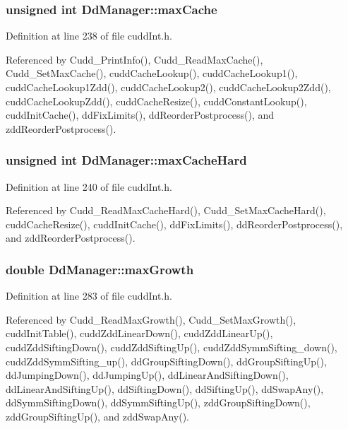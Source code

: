 \subsubsection{\setlength{\rightskip}{0pt plus 5cm}unsigned int \bf{Dd\-Manager::max\-Cache}}\label{structDdManager_b84e06c3faa0e9bb04501ede05b5fcc1}




Definition at line 238 of file cudd\-Int.h.

Referenced by Cudd\_\-Print\-Info(), Cudd\_\-Read\-Max\-Cache(), Cudd\_\-Set\-Max\-Cache(), cudd\-Cache\-Lookup(), cudd\-Cache\-Lookup1(), cudd\-Cache\-Lookup1Zdd(), cudd\-Cache\-Lookup2(), cudd\-Cache\-Lookup2Zdd(), cudd\-Cache\-Lookup\-Zdd(), cudd\-Cache\-Resize(), cudd\-Constant\-Lookup(), cudd\-Init\-Cache(), dd\-Fix\-Limits(), dd\-Reorder\-Postprocess(), and zdd\-Reorder\-Postprocess().
\subsubsection{\setlength{\rightskip}{0pt plus 5cm}unsigned int \bf{Dd\-Manager::max\-Cache\-Hard}}\label{structDdManager_1b53bee9cf86fc1131c420c2aef7e473}




Definition at line 240 of file cudd\-Int.h.

Referenced by Cudd\_\-Read\-Max\-Cache\-Hard(), Cudd\_\-Set\-Max\-Cache\-Hard(), cudd\-Cache\-Resize(), cudd\-Init\-Cache(), dd\-Fix\-Limits(), dd\-Reorder\-Postprocess(), and zdd\-Reorder\-Postprocess().
\subsubsection{\setlength{\rightskip}{0pt plus 5cm}double \bf{Dd\-Manager::max\-Growth}}\label{structDdManager_8a6a4238d1bc8a87eabd2c3eabd233d7}




Definition at line 283 of file cudd\-Int.h.

Referenced by Cudd\_\-Read\-Max\-Growth(), Cudd\_\-Set\-Max\-Growth(), cudd\-Init\-Table(), cudd\-Zdd\-Linear\-Down(), cudd\-Zdd\-Linear\-Up(), cudd\-Zdd\-Sifting\-Down(), cudd\-Zdd\-Sifting\-Up(), cudd\-Zdd\-Symm\-Sifting\_\-down(), cudd\-Zdd\-Symm\-Sifting\_\-up(), dd\-Group\-Sifting\-Down(), dd\-Group\-Sifting\-Up(), dd\-Jumping\-Down(), dd\-Jumping\-Up(), dd\-Linear\-And\-Sifting\-Down(), dd\-Linear\-And\-Sifting\-Up(), dd\-Sifting\-Down(), dd\-Sifting\-Up(), dd\-Swap\-Any(), dd\-Symm\-Sifting\-Down(), dd\-Symm\-Sifting\-Up(), zdd\-Group\-Sifting\-Down(), zdd\-Group\-Sifting\-Up(), and zdd\-Swap\-Any().
